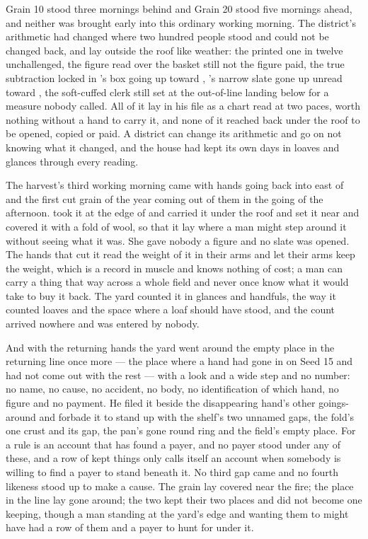 Grain 10 stood three mornings behind and Grain 20 stood five mornings ahead, and neither was brought early into this ordinary working morning. The district's arithmetic had changed where two hundred people stood and could not be changed back, and lay outside the roof like weather: the printed one in twelve unchallenged, the figure read over the basket still not the figure paid, the true subtraction locked in 's box going up toward , 's narrow slate gone up unread toward , the soft-cuffed clerk still set at the out-of-line landing below  for a measure nobody called. All of it lay in his file as a chart read at two paces, worth nothing without a hand to carry it, and none of it reached back under the roof to be opened, copied or paid. A district can change its arithmetic and go on not knowing what it changed, and the house had kept its own days in loaves and glances through every reading.

\scenebreak

The harvest's third working morning came with hands going back into  east of  and the first cut grain of the year coming out of them in the going of the afternoon.  took it at the edge of  and carried it under the roof and set it near  and covered it with a fold of wool, so that it lay where a man might step around it without seeing what it was. She gave nobody a figure and no slate was opened. The hands that cut it read the weight of it in their arms and let their arms keep the weight, which is a record in muscle and knows nothing of cost; a man can carry a thing that way across a whole field and never once know what it would take to buy it back. The yard counted it in glances and handfuls, the way it counted loaves and the space where a loaf should have stood, and the count arrived nowhere and was entered by nobody.

And with the returning hands the yard went around the empty place in the returning line once more --- the place where a hand had gone in on Seed 15 and had not come out with the rest --- with a look and a wide step and no number: no name, no cause, no accident, no body, no identification of which hand, no figure and no payment. He filed it beside the disappearing hand's other goings-around and forbade it to stand up with the shelf's two unnamed gaps, the fold's one crust and its gap, the pan's gone round ring and the field's empty place. For a rule is an account that has found a payer, and no payer stood under any of these, and a row of kept things only calls itself an account when somebody is willing to find a payer to stand beneath it. No third gap came and no fourth likeness stood up to make a cause. The grain lay covered near the fire; the place in the line lay gone around; the two kept their two places and did not become one keeping, though a man standing at the yard's edge and wanting them to might have had a row of them and a payer to hunt for under it.

